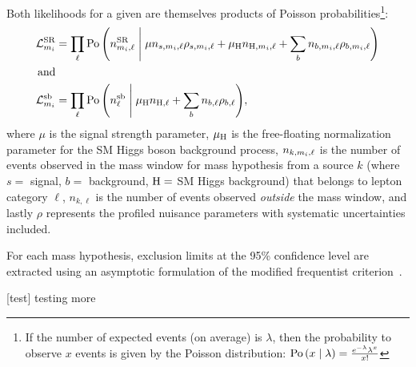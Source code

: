 Both likelihoods for a given  are themselves products of Poisson probabilities\footnote
{
    If the number of expected events (on average) is $\lambda$, then the probability to observe $x$ events is given by the Poisson distribution:
    $\text{Po}\left( x \; \middle| \;{} \lambda \right) = \frac{e^{-\lambda} \lambda^x}{x!}$
}:
\begin{align*}
    \lhoodSR &= \prod_\ell{
        \poisson{
            n^\text{SR}_{\mass{i},\ell}
            \middlepipe
            \mu n_{s, \mass{i}, \ell} \rho_{s, \mass{i}, \ell} + \mu_\PH n_{\PH, \mass{i}, \ell} + 
            \sum_b{
                n_{b, \mass{i}, \ell} \rho_{b, \mass{i}, \ell}
                }
            }
    }
    \\
    \text{and} &
    \\
    \lhoodsb &= \prod_\ell{
        \poisson{
            n^\text{sb}_{\ell}
            \middlepipe
            \mu_\PH n_{\PH, \ell} + 
            \sum_b{
                n_{b, \ell} \rho_{b, \ell}
                }
            }
    },
\end{align*}
where $\mu$ is the signal strength parameter,
$\mu_\mathrm{H}$ is the free-floating normalization parameter for the SM Higgs boson background process,
$n_{k, m_{i}, \ell}$ is the number of events observed in the mass window for mass hypothesis  from a source $k$ (where $s=$ signal, $b=$ background, $\mathrm{H}=$ SM Higgs background) that belongs to lepton category $\ell$,
$n_{k, \ell}$ is the number of events observed \emph{outside} the mass window,
and lastly $\rho$ represents the profiled nuisance parameters with systematic uncertainties included.

For each mass hypothesis, exclusion limits at the 95\% confidence level are extracted using an asymptotic formulation of the modified frequentist \CLs criterion~\cite{cowan_asymptotic_2011, higgs_combo_proc_2011}.

\begin{multiFigure}
        \centering
            [test]
            {testing more}
        \label{fig:yield_hzzd_mZ2}
\end{multiFigure}

\begin{multiFigure}
        \centering
        \label{fig:yield_hzdzd_mZ12}
\end{multiFigure}

